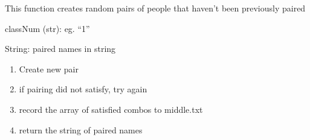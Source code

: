 \documentclass[letterpaper,10pt,english]{sphinxmanual}
\begin{document}
\begin{fulllineitems}
\label{\detokenize{pairing:pairing.producePair}}
\pysigstartsignatures
{}
\pysigstopsignatures
\sphinxAtStartPar
This function creates random pairs of people that haven’t been previously paired
\begin{description}
\sphinxAtStartPar
classNum (str): eg. “1”

\sphinxAtStartPar
String: paired names in string

\end{description}
\begin{enumerate}
%
\item {} 
\sphinxAtStartPar
Create new pair

\item {} 
\sphinxAtStartPar
if pairing did not satisfy, try again

\item {} 
\sphinxAtStartPar
record the array of satisfied combos to middle.txt

\item {} 
\sphinxAtStartPar
return the string of paired names

\end{enumerate}

\end{fulllineitems}


\begin{fulllineitems}
\label{\detokenize{pairing:pairing.record}}
\pysigstartsignatures
{}
\pysigstopsignatures
\end{fulllineitems}

\end{document}
